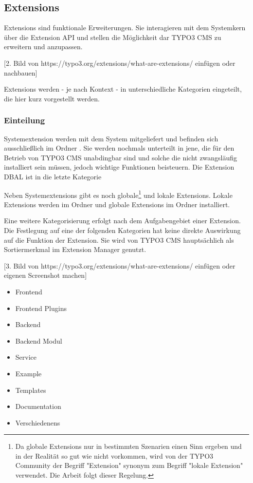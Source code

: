 \subsection{Extensions}
Extensions sind funktionale Erweiterungen. Sie interagieren mit dem Systemkern über die Extension API und stellen die Möglichkeit dar TYPO3 CMS zu erweitern und anzupassen.

[2. Bild von https://typo3.org/extensions/what-are-extensions/ einfügen oder nachbauen]

Extensions werden - je nach Kontext - in unterschiedliche Kategorien eingeteilt, die hier kurz vorgestellt werden.

\subsubsection{Einteilung}
Systemextension werden mit dem System mitgeliefert und befinden sich ausschließlich im Ordner . Sie werden nochmals unterteilt in jene, die für den Betrieb von TYPO3 CMS unabdingbar sind und solche die nicht zwangsläufig installiert sein müssen, jedoch wichtige Funktionen beisteuern. Die Extension DBAL ist in die letzte Kategorie %

Neben Systemextensions gibt es noch globale\footnote{Da globale Extensions nur in bestimmten Szenarien einen Sinn ergeben und in der Realität so gut wie nicht vorkommen, wird von der TYPO3 Community der Begriff "Extension" synonym zum Begriff "lokale Extension" verwendet. Die Arbeit folgt dieser Regelung.} und lokale Extensions. Lokale Extensions werden im Ordner  und globale Extensions im Ordner  installiert.

Eine weitere Kategorisierung erfolgt nach dem Aufgabengebiet einer Extension. Die Festlegung auf eine der folgenden Kategorien hat keine direkte Auswirkung auf die Funktion der Extension. Sie wird von TYPO3 CMS hauptsächlich als Sortiermerkmal im Extension Manager genutzt.

[3. Bild von https://typo3.org/extensions/what-are-extensions/ einfügen oder eigenen Screenshot machen]

\begin{itemize}
	\item
		Frontend
	\item
		Frontend Plugins
	\item
		Backend
	\item
		Backend Modul
	\item
		Service
	\item
		Example
	\item
		Templates
	\item
		Documentation
	\item
		Verschiedenens
\end{itemize}

